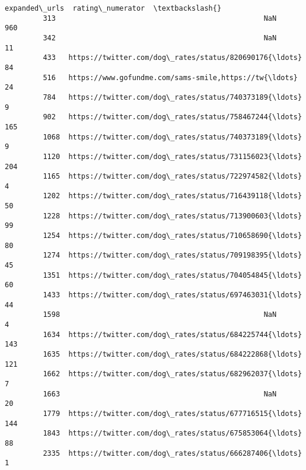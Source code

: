 \documentclass[11pt]{article}
\begin{document}
\begin{Verbatim}[commandchars=\\\{\}]
                                                   expanded\_urls  rating\_numerator  \textbackslash{}
         313                                                 NaN               960   
         342                                                 NaN                11   
         433   https://twitter.com/dog\_rates/status/820690176{\ldots}                84   
         516   https://www.gofundme.com/sams-smile,https://tw{\ldots}                24   
         784   https://twitter.com/dog\_rates/status/740373189{\ldots}                 9   
         902   https://twitter.com/dog\_rates/status/758467244{\ldots}               165   
         1068  https://twitter.com/dog\_rates/status/740373189{\ldots}                 9   
         1120  https://twitter.com/dog\_rates/status/731156023{\ldots}               204   
         1165  https://twitter.com/dog\_rates/status/722974582{\ldots}                 4   
         1202  https://twitter.com/dog\_rates/status/716439118{\ldots}                50   
         1228  https://twitter.com/dog\_rates/status/713900603{\ldots}                99   
         1254  https://twitter.com/dog\_rates/status/710658690{\ldots}                80   
         1274  https://twitter.com/dog\_rates/status/709198395{\ldots}                45   
         1351  https://twitter.com/dog\_rates/status/704054845{\ldots}                60   
         1433  https://twitter.com/dog\_rates/status/697463031{\ldots}                44   
         1598                                                NaN                 4   
         1634  https://twitter.com/dog\_rates/status/684225744{\ldots}               143   
         1635  https://twitter.com/dog\_rates/status/684222868{\ldots}               121   
         1662  https://twitter.com/dog\_rates/status/682962037{\ldots}                 7   
         1663                                                NaN                20   
         1779  https://twitter.com/dog\_rates/status/677716515{\ldots}               144   
         1843  https://twitter.com/dog\_rates/status/675853064{\ldots}                88   
         2335  https://twitter.com/dog\_rates/status/666287406{\ldots}                 1   
         

\end{Verbatim}
\end{document}
